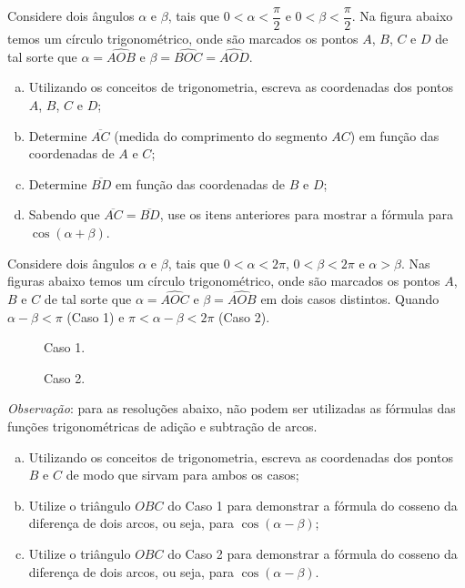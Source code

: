 \begin{exercise}
  Considere dois ângulos $\alpha$ e $\beta$, tais que $0 < \alpha < \dfrac \pi 2$ e $0 < \beta < \dfrac \pi 2$. Na figura abaixo temos um círculo trigonométrico, onde são marcados os pontos $A$, $B$, $C$ e $D$ de tal sorte que $\alpha = \widehat{AOB}$ e $\beta = \widehat{BOC} = \widehat{AOD}$.
  \begin{center}
    \label{fig:cos-da-soma}
  \end{center}
  \begin{enumerate}[a)]
    \item Utilizando os conceitos de trigonometria, escreva as coordenadas dos pontos $A$, $B$, $C$ e $D$;
    \item Determine $\overline{AC}$ (medida do comprimento do segmento $AC$) em função das coordenadas de $A$ e $C$;
    \item Determine $\overline{BD}$ em função das coordenadas de $B$ e $D$;
    \item Sabendo que $\overline{AC} = \overline{BD}$, use os itens anteriores para mostrar a fórmula para $\cos (\alpha + \beta)$.
    \end{enumerate}
\end{exercise}

\begin{exercise}
  Considere dois ângulos $\alpha$ e $\beta$, tais que $0 < \alpha < 2 \pi$, $0 < \beta < 2 \pi$ e $\alpha > \beta$. Nas figuras abaixo temos um círculo trigonométrico, onde são marcados os pontos $A$, $B$ e $C$ de tal sorte que $\alpha = \widehat{AOC}$ e $\beta = \widehat{AOB}$ em dois casos distintos. Quando $\alpha - \beta < \pi$ (Caso 1) e $\pi < \alpha - \beta < 2\pi$ (Caso 2). 
  \begin{figure}[H]
    \centering
    \caption{Caso 1.}
    \label{fig:cos-da-diferenca1}
  \end{figure}

  \begin{figure}[H]
    \centering
    \label{fig:cos-da-diferenca2}
    \caption{Caso 2.}
  \end{figure}

  \textit{Observação}: para as resoluções abaixo, não podem ser utilizadas as fórmulas das funções trigonométricas de adição e subtração de arcos.
  \begin{enumerate}[a)]
      \item Utilizando os conceitos de trigonometria, escreva as coordenadas dos pontos $B$ e $C$ de modo que sirvam para ambos os casos;
      \item Utilize o triângulo $OBC$ do Caso 1 para demonstrar a fórmula do cosseno da diferença de dois arcos, ou seja, para $\cos (\alpha - \beta)$;
      \item  Utilize o triângulo $OBC$ do Caso 2 para demonstrar a fórmula do cosseno da diferença de dois arcos, ou seja, para $\cos (\alpha - \beta)$.
\end{enumerate}
\end{exercise}

